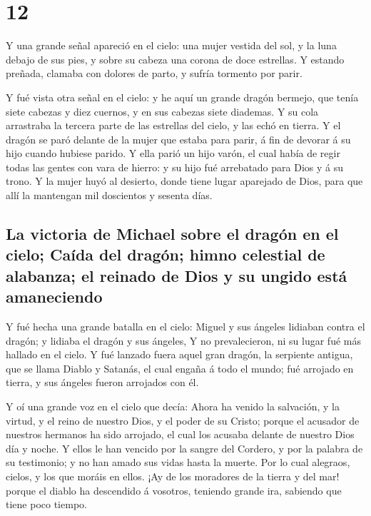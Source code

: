 \hypertarget{section-11}{%
\section{12}\label{section-11}}

 Y una grande señal apareció en el cielo: una mujer vestida
del sol, y la luna debajo de sus pies, y sobre su cabeza una corona de
doce estrellas.  Y estando preñada, clamaba con dolores de
parto, y sufría tormento por parir.

 Y fué vista otra señal en el cielo: y he aquí un grande
dragón bermejo, que tenía siete cabezas y diez cuernos, y en sus cabezas
siete diademas.  Y su cola arrastraba la tercera parte de
las estrellas del cielo, y las echó en tierra. Y el dragón se paró
delante de la mujer que estaba para parir, á fin de devorar á su hijo
cuando hubiese parido.  Y ella parió un hijo varón, el cual
había de regir todas las gentes con vara de hierro: y su hijo fué
arrebatado para Dios y á su trono.  Y la mujer huyó al
desierto, donde tiene lugar aparejado de Dios, para que allí la
mantengan mil doscientos y sesenta días.

\hypertarget{la-victoria-de-michael-sobre-el-draguxf3n-en-el-cielo-cauxedda-del-draguxf3n-himno-celestial-de-alabanza-el-reinado-de-dios-y-su-ungido-estuxe1-amaneciendo}{%
\subsection{La victoria de Michael sobre el dragón en el cielo; Caída
del dragón; himno celestial de alabanza; el reinado de Dios y su ungido
está
amaneciendo}\label{la-victoria-de-michael-sobre-el-draguxf3n-en-el-cielo-cauxedda-del-draguxf3n-himno-celestial-de-alabanza-el-reinado-de-dios-y-su-ungido-estuxe1-amaneciendo}}

 Y fué hecha una grande batalla en el cielo: Miguel y sus
ángeles lidiaban contra el dragón; y lidiaba el dragón y sus ángeles,
 Y no prevalecieron, ni su lugar fué más hallado en el
cielo.  Y fué lanzado fuera aquel gran dragón, la serpiente
antigua, que se llama Diablo y Satanás, el cual engaña á todo el mundo;
fué arrojado en tierra, y sus ángeles fueron arrojados con él.

 Y oí una grande voz en el cielo que decía: Ahora ha venido
la salvación, y la virtud, y el reino de nuestro Dios, y el poder de su
Cristo; porque el acusador de nuestros hermanos ha sido arrojado, el
cual los acusaba delante de nuestro Dios día y noche.  Y
ellos le han vencido por la sangre del Cordero, y por la palabra de su
testimonio; y no han amado sus vidas hasta la muerte.  Por
lo cual alegraos, cielos, y los que moráis en ellos. ¡Ay de los
moradores de la tierra y del mar! porque el diablo ha descendido á
vosotros, teniendo grande ira, sabiendo que tiene poco tiempo.

